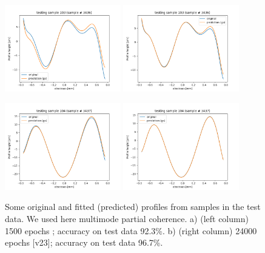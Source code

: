 \documentclass{iucr}
\newcommand{\inred}[1]{{\color{red}#1}}
\begin{document}
\begin{figure}
\includegraphics[width=0.45\textwidth]{figures/v20p103.png}
\includegraphics[width=0.45\textwidth]{figures/v23p103.png}

\includegraphics[width=0.45\textwidth]{figures/v20p104.png}
\includegraphics[width=0.45\textwidth]{figures/v23p104.png}
\caption{
Some original and fitted (predicted) profiles from samples in the test data. We used here multimode partial coherence.
a) (left column) 1500 epochs \inred{{[v20]}};
accuracy on test data 92.3\%. 
b) (right column) 24000 epochs \inred{[v23]};
accuracy on test data 96.7\%.
    }
\end{figure}
\end{document}
